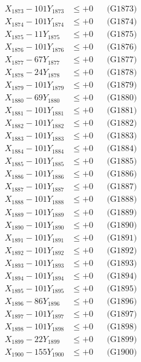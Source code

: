 \documentclass[a4paper,10pt]{article}
\begin{document}
{\begin{align}
X_{1873} - 101Y_{1873} &\leq +0 && \text{(G1873)} \\
X_{1874} - 101Y_{1874} &\leq +0 && \text{(G1874)} \\
X_{1875} - 11Y_{1875} &\leq +0 && \text{(G1875)} \\
X_{1876} - 101Y_{1876} &\leq +0 && \text{(G1876)} \\
X_{1877} - 67Y_{1877} &\leq +0 && \text{(G1877)} \\
X_{1878} - 24Y_{1878} &\leq +0 && \text{(G1878)} \\
X_{1879} - 101Y_{1879} &\leq +0 && \text{(G1879)} \\
X_{1880} - 69Y_{1880} &\leq +0 && \text{(G1880)} \\
\allowbreak
X_{1881} - 101Y_{1881} &\leq +0 && \text{(G1881)} \\
X_{1882} - 101Y_{1882} &\leq +0 && \text{(G1882)} \\
X_{1883} - 101Y_{1883} &\leq +0 && \text{(G1883)} \\
X_{1884} - 101Y_{1884} &\leq +0 && \text{(G1884)} \\
X_{1885} - 101Y_{1885} &\leq +0 && \text{(G1885)} \\
X_{1886} - 101Y_{1886} &\leq +0 && \text{(G1886)} \\
X_{1887} - 101Y_{1887} &\leq +0 && \text{(G1887)} \\
X_{1888} - 101Y_{1888} &\leq +0 && \text{(G1888)} \\
X_{1889} - 101Y_{1889} &\leq +0 && \text{(G1889)} \\
X_{1890} - 101Y_{1890} &\leq +0 && \text{(G1890)} \\
\allowbreak
X_{1891} - 101Y_{1891} &\leq +0 && \text{(G1891)} \\
X_{1892} - 101Y_{1892} &\leq +0 && \text{(G1892)} \\
X_{1893} - 101Y_{1893} &\leq +0 && \text{(G1893)} \\
X_{1894} - 101Y_{1894} &\leq +0 && \text{(G1894)} \\
X_{1895} - 101Y_{1895} &\leq +0 && \text{(G1895)} \\
X_{1896} - 86Y_{1896} &\leq +0 && \text{(G1896)} \\
X_{1897} - 101Y_{1897} &\leq +0 && \text{(G1897)} \\
X_{1898} - 101Y_{1898} &\leq +0 && \text{(G1898)} \\
X_{1899} - 22Y_{1899} &\leq +0 && \text{(G1899)} \\
X_{1900} - 155Y_{1900} &\leq +0 && \text{(G1900)} \\

\end{align}}
\end{document}
